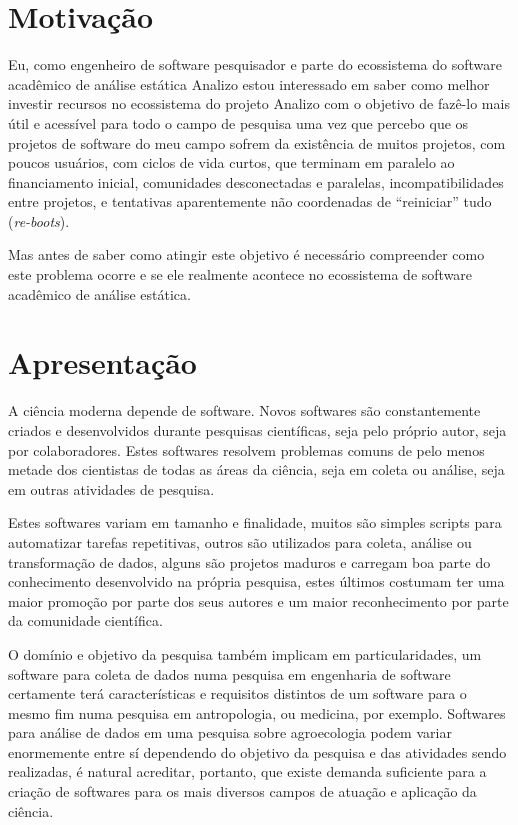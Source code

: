 
\section{Motivação}

Eu, como engenheiro de software pesquisador e parte do ecossistema do software
acadêmico de análise estática Analizo estou interessado em saber como melhor
investir recursos no ecossistema do projeto Analizo com o objetivo de fazê-lo
mais útil e acessível para todo o campo de pesquisa uma vez que percebo que os
projetos de software do meu campo sofrem da existência de muitos projetos, com
poucos usuários, com ciclos de vida curtos, que terminam em paralelo ao
financiamento inicial, comunidades desconectadas e paralelas,
incompatibilidades entre projetos, e tentativas aparentemente não coordenadas
de ``reiniciar'' tudo ({\it re-boots}).

Mas antes de saber como atingir este objetivo é necessário compreender como
este problema ocorre e se ele realmente acontece no ecossistema de software
acadêmico de análise estática.


\section{Apresentação}

A ciência moderna depende de software. Novos softwares são constantemente
criados e desenvolvidos durante pesquisas científicas, seja pelo próprio autor,
seja por colaboradores. Estes softwares resolvem
problemas comuns de pelo menos metade dos cientistas de todas as áreas da
ciência, seja em coleta ou análise, seja em outras atividades de pesquisa.

Estes softwares variam em tamanho e finalidade, muitos são simples
scripts para automatizar tarefas repetitivas, outros são utilizados para
coleta, análise ou transformação de dados, alguns são projetos maduros e
carregam boa parte do conhecimento desenvolvido na própria pesquisa, estes
últimos costumam ter uma maior promoção por parte dos seus autores e um maior
reconhecimento por parte da comunidade científica.

O domínio e objetivo da pesquisa também implicam em particularidades,
um software para coleta de dados numa pesquisa em engenharia de
software certamente terá características e requisitos distintos de um software
para o mesmo fim numa pesquisa em antropologia, ou medicina, por exemplo.
Softwares para análise de dados em uma pesquisa sobre agroecologia podem variar
enormemente entre sí dependendo do objetivo da pesquisa e das atividades sendo
realizadas, é natural acreditar, portanto, que existe demanda suficiente para a
criação de softwares para os mais diversos campos de atuação e aplicação da
ciência.

